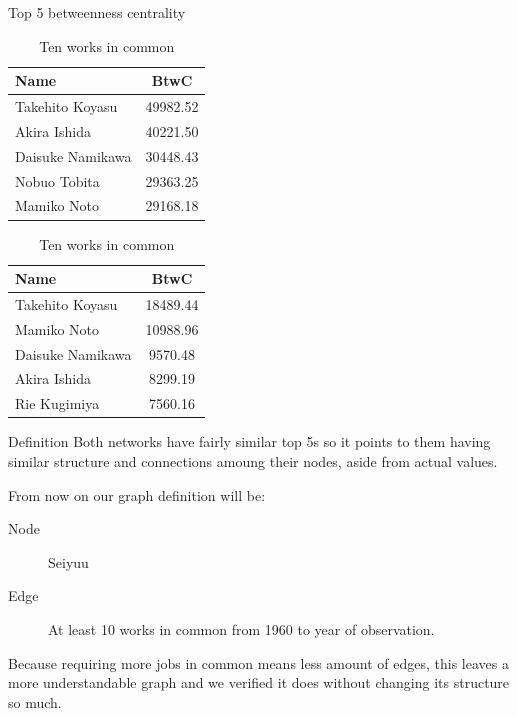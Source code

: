\begin{frame}{Top 5 betweenness centrality}
\begin{table}[!htb]
    \begin{minipage}{.5\textwidth}
        \centering
            \begin{tabular}{|l|c|}
				\hline
				Name & BtwC \\
				\hline
				Takehito Koyasu & 49982.52 \\
				\hline
				Akira Ishida & 40221.50 \\
				\hline
				Daisuke Namikawa & 30448.43 \\
				\hline
				Nobuo Tobita & 29363.25 \\
				\hline
				Mamiko Noto & 29168.18 \\
				\hline
		\end{tabular}
        \caption{One work in common}
    \end{minipage}%
    \begin{minipage}{.5\textwidth}
        \centering
        \begin{tabular}{|l|c|}
				\hline
				Name & BtwC \\
				\hline
				Takehito Koyasu & 18489.44 \\
				\hline
				Mamiko Noto & 10988.96 \\
				\hline
				Daisuke Namikawa & 9570.48 \\
				\hline
				Akira Ishida & 8299.19 \\
				\hline
				Rie Kugimiya & 7560.16 \\
				\hline
		\end{tabular}
        \caption{Ten works in common}
    \end{minipage}
\end{table}
\end{frame}

\begin{frame}{Definition}
Both networks have fairly similar top 5s so it points to them having similar structure and connections amoung their nodes, aside from actual values.
\vspace{10pt}

From now on our graph definition will be:
\begin{description}
\item[Node] Seiyuu
\item[Edge] At least 10 works in common from 1960 to year of observation.
\end{description}
\vspace{10pt}

Because requiring more jobs in common means less amount of edges, this leaves a more understandable graph and we verified it does without changing its structure so much.
\end{frame}